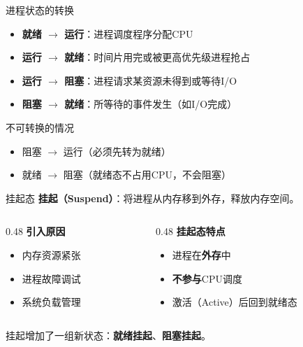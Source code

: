 \documentclass[10pt, aspectratio=169]{beamer}
\begin{document}
\begin{frame}{进程状态的转换}
    \begin{itemize}
        \item \textbf{就绪 $\to$ 运行}：进程调度程序分配CPU
        \item \textbf{运行 $\to$ 就绪}：时间片用完或被更高优先级进程抢占
        \item \textbf{运行 $\to$ 阻塞}：进程请求某资源未得到或等待I/O
        \item \textbf{阻塞 $\to$ 就绪}：所等待的事件发生（如I/O完成）
    \end{itemize}
    \vspace{0.5em}
    \begin{alertblock}{不可转换的情况}
        \begin{itemize}
            \item 阻塞 $\to$ 运行（必须先转为就绪）
            \item 就绪 $\to$ 阻塞（就绪态不占用CPU，不会阻塞）
        \end{itemize}
    \end{alertblock}
\end{frame}

\begin{frame}{挂起态}
    \textbf{挂起（Suspend）}：将进程从内存移到外存，释放内存空间。

    \vspace{0.5em}
    \begin{columns}
        \begin{column}{0.48\textwidth}
            \textbf{引入原因}
            \begin{itemize}
                \item 内存资源紧张
                \item 进程故障调试
                \item 系统负载管理
            \end{itemize}
        \end{column}
        \begin{column}{0.48\textwidth}
            \textbf{挂起态特点}
            \begin{itemize}
                \item 进程在\textbf{外存}中
                \item \textbf{不参与}CPU调度
                \item 激活（Active）后回到就绪态
            \end{itemize}
        \end{column}
    \end{columns}
    \vspace{0.5em}
    \begin{exampleblock}
        挂起增加了一组新状态：\textbf{就绪挂起}、\textbf{阻塞挂起}。
    \end{exampleblock}
\end{frame}
\end{document}
